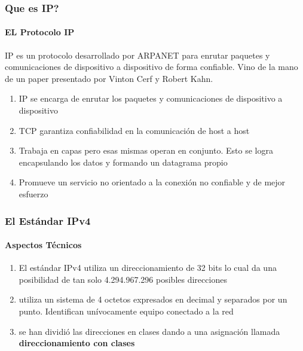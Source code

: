 \documentclass{beamer}
\begin{document}
\begin{frame}
\frametitle{Que es IP? }
\framesubtitle{EL Protocolo IP}


	IP es un protocolo desarrollado por ARPANET para enrutar paquetes y comunicaciones de dispositivo a dispositivo de forma confiable. Vino de la mano de un paper presentado por Vinton Cerf y Robert Kahn.
\begin{enumerate}[$*$]

	\item IP se encarga de enrutar los paquetes y comunicaciones de dispositivo a dispositivo
	\item TCP garantiza confiabilidad en la comunicación de host a host
	\item Trabaja en capas pero esas mismas operan en conjunto. Esto se logra encapsulando los datos y formando un datagrama propio
	\item Promueve un servicio no orientado a la conexión no confiable y de mejor esfuerzo
	
\end{enumerate}
\end{frame}



\begin{frame}
\frametitle{El Estándar IPv4}
\framesubtitle{Aspectos Técnicos}


\begin{enumerate}[$*$]

	\item El estándar IPv4 utiliza un direccionamiento de 32 bits lo cual da una posibilidad de tan solo 
		4.294.967.296 posibles direcciones
	\item utiliza un sistema de 4 octetos expresados en decimal y separados por un punto. Identifican unívocamente equipo conectado a la red
	\item se han dividió las direcciones en clases
dando a una asignación llamada \textbf{direccionamiento con clases}
	
\end{enumerate}
\end{frame}

%



	
	
\end{document}
